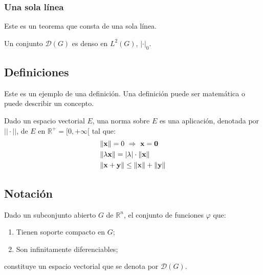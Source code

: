 \subsubsection{Una sola línea}
Este es un teorema que consta de una sola línea.

\begin{theorem}
	Un conjunto $\mathcal{D}(G)$ es denso en $L^2(G)$, $|\cdot|_0$.
\end{theorem}


\subsection{Definiciones}

Este es un ejemplo de una definición. Una definición puede ser matemática o puede describir un concepto.

\begin{definition}
	Dado un espacio vectorial $E$, una norma sobre $E$ es una aplicación, denotada por $||\cdot||$, de $E$ en $\mathbb{R}^+=[0,+\infty[$ tal que:
	\begin{align}
		& \norm{\mathbf{x}}=0\ \Rightarrow\ \mathbf{x}=\mathbf{0}\\
		& \norm{\lambda \mathbf{x}}=\abs{\lambda}\cdot \norm{\mathbf{x}}\\
		& \norm{\mathbf{x}+\mathbf{y}}\leq \norm{\mathbf{x}} + \norm{\mathbf{y}}
	\end{align}
\end{definition}

\subsection{Notación}

\begin{notation}
	Dado un subconjunto abierto $G$ de $\mathbb{R}^n$, el conjunto de funciones $\varphi$ que:
	\begin{enumerate}
		\item Tienen soporte compacto en $G$;
		\item Son infinitamente diferenciables;
	\end{enumerate}
	constituye un espacio vectorial que se denota por $\mathcal{D}(G)$.
\end{notation}


